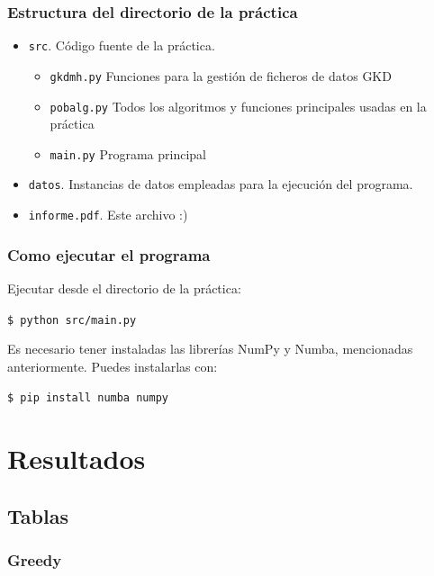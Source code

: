\documentclass{article}
\begin{document}
    \subsubsection{Estructura del directorio de la práctica}
    \begin{itemize}
        \item \texttt{src}.
        Código fuente de la práctica.
        \begin{itemize}
            \item \texttt{gkdmh.py}
            Funciones para la gestión de ficheros de datos GKD
            \item \texttt{pobalg.py}
            Todos los algoritmos y funciones principales usadas en
            la práctica
            \item \texttt{main.py}
            Programa principal
        \end{itemize}
        \item \texttt{datos}.
        Instancias de datos empleadas para la ejecución del programa.
        \item \texttt{informe.pdf}.
        Este archivo :)
    \end{itemize}

    \subsubsection{Como ejecutar el programa}
    Ejecutar desde el directorio de la práctica:

    \texttt{\$ python src/main.py}

    Es necesario tener instaladas las librerías NumPy y Numba,
    mencionadas anteriormente. Puedes instalarlas con:

    \texttt{\$ pip install numba numpy}

    \pagebreak
    \section{Resultados}

    \subsection{Tablas}

    \subsubsection{Greedy}
\end{document}
